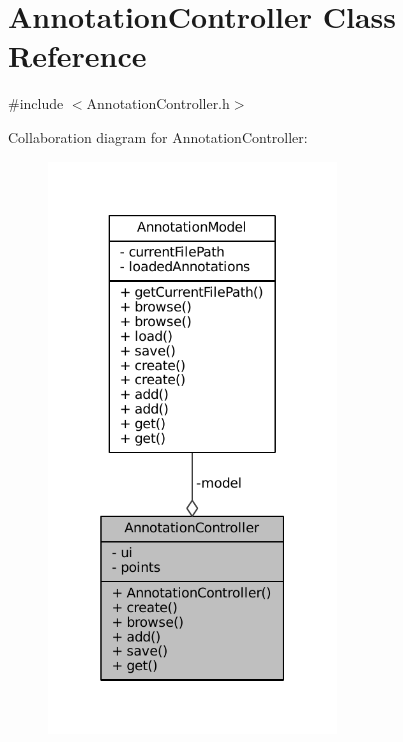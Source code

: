 \hypertarget{classAnnotationController}{}\section{Annotation\+Controller Class Reference}
\label{classAnnotationController}


{\ttfamily \#include $<$Annotation\+Controller.\+h$>$}



Collaboration diagram for Annotation\+Controller\+:
\nopagebreak
\begin{figure}[H]
\begin{center}
\leavevmode
\includegraphics[width=217pt]{classAnnotationController__coll__graph}
\end{center}
\end{figure}

